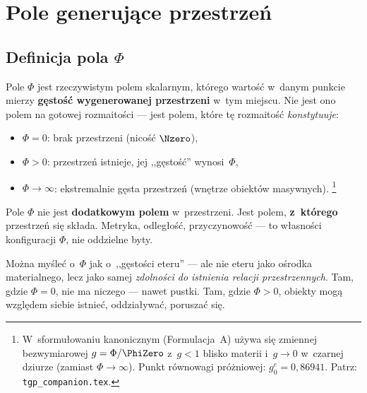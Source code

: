 \section{Pole generuj\k{a}ce przestrze\'n}\label{sec:pole}

\subsection{Definicja pola $\Phi$}

\begin{definition}\label{def:Phi}
Pole $\Phi$ jest rzeczywistym polem skalarnym, kt\'orego warto\'s\'c
w~danym punkcie mierzy \textbf{g\k{e}sto\'s\'c wygenerowanej przestrzeni}
w~tym miejscu. Nie jest ono polem na gotowej rozmaito\'sci ---
jest polem, kt\'ore t\k{e} rozmaito\'s\'c \emph{konstytuuje}:
\begin{itemize}[nosep]
  \item $\Phi = 0$: brak przestrzeni (nico\'s\'c $\Nzero$),
  \item $\Phi > 0$: przestrze\'n istnieje, jej ,,g\k{e}sto\'s\'c''
        wynosi~$\Phi$,
  \item $\Phi \to \infty$: ekstremalnie g\k{e}sta przestrze\'n
        (wn\k{e}trze obiekt\'ow masywnych).%
        \footnote{W~sformu\l{}owaniu kanonicznym (Formulacja~A) u\.zywa si\k{e}
        zmiennej bezwymiarowej $g = \Phi/\PhiZero$ z~$g < 1$ blisko materii
        i~$g \to 0$ w~czarnej dziurze (zamiast $\Phi \to \infty$).
        Punkt r\'ownowagi pr\'o\.zniowej: $g_0^e = 0{,}86941$.
        Patrz: \texttt{tgp\_companion.tex}.}
\end{itemize}
\end{definition}

Pole $\Phi$ nie jest \textbf{dodatkowym polem} w~przestrzeni.
Jest polem, \textbf{z~kt\'orego} przestrze\'n si\k{e} sk\l{}ada.
Metryka, odleg\l{}o\'s\'c, przyczynowo\'s\'c --- to w\l{}asno\'sci
konfiguracji $\Phi$, nie oddzielne byty.

\begin{remark}
Mo\.zna my\'sle\'c o~$\Phi$ jak o~,,g\k{e}sto\'sci eteru'' ---
ale nie eteru jako o\'srodka materialnego, lecz jako samej
\emph{zdolno\'sci do istnienia relacji przestrzennych}.
Tam, gdzie $\Phi = 0$, nie ma niczego --- nawet pustki.
Tam, gdzie $\Phi > 0$, obiekty mog\k{a} wzgl\k{e}dem siebie
istnie\'c, oddzia\l{}ywa\'c, porusza\'c si\k{e}.
\end{remark}

